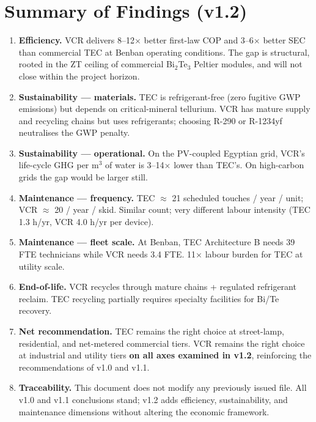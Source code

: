 \documentclass[11pt,a4paper]{article}
\begin{document}
\section{Summary of Findings (v1.2)}
\label{sec:summary_v12}

\begin{enumerate}[leftmargin=*]
  \item \textbf{Efficiency.} VCR delivers 8--12$\times$ better first-law COP and 3--6$\times$ better SEC than commercial TEC at Benban operating conditions. The gap is structural, rooted in the ZT ceiling of commercial Bi$_2$Te$_3$ Peltier modules, and will not close within the project horizon.
  \item \textbf{Sustainability --- materials.} TEC is refrigerant-free (zero fugitive GWP emissions) but depends on critical-mineral tellurium. VCR has mature supply and recycling chains but uses refrigerants; choosing R-290 or R-1234yf neutralises the GWP penalty.
  \item \textbf{Sustainability --- operational.} On the PV-coupled Egyptian grid, VCR's life-cycle GHG per m$^3$ of water is 3--14$\times$ lower than TEC's. On high-carbon grids the gap would be larger still.
  \item \textbf{Maintenance --- frequency.} TEC $\approx$ 21 scheduled touches / year / unit; VCR $\approx$ 20 / year / skid. Similar count; very different labour intensity (TEC 1.3 h/yr, VCR 4.0 h/yr per device).
  \item \textbf{Maintenance --- fleet scale.} At Benban, TEC Architecture B needs 39 FTE technicians while VCR needs 3.4 FTE. 11$\times$ labour burden for TEC at utility scale.
  \item \textbf{End-of-life.} VCR recycles through mature chains + regulated refrigerant reclaim. TEC recycling partially requires specialty facilities for Bi/Te recovery.
  \item \textbf{Net recommendation.} TEC remains the right choice at street-lamp, residential, and net-metered commercial tiers. VCR remains the right choice at industrial and utility tiers \textbf{on all axes examined in v1.2}, reinforcing the recommendations of v1.0 and v1.1.
  \item \textbf{Traceability.} This document does not modify any previously issued file. All v1.0 and v1.1 conclusions stand; v1.2 adds efficiency, sustainability, and maintenance dimensions without altering the economic framework.
\end{enumerate}
\end{document}
